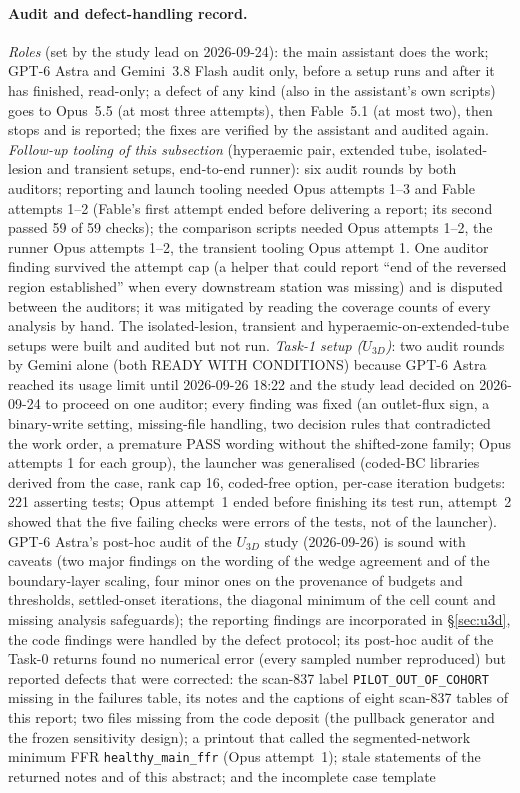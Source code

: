 \documentclass[11pt]{article}
\begin{document}
\paragraph{Audit and defect-handling record.}\label{sec:followup-audit} \emph{Roles} (set by the study lead on 2026-09-24): the main assistant does the work; GPT-6 Astra and Gemini~3.8 Flash audit only, before a setup runs and after it has finished, read-only; a defect of any kind (also in the assistant's own scripts) goes to Opus~5.5 (at most three attempts), then Fable~5.1 (at most two), then stops and is reported; the fixes are verified by the assistant and audited again. \emph{Follow-up tooling of this subsection} (hyperaemic pair, extended tube, isolated-lesion and transient setups, end-to-end runner): six audit rounds by both auditors; reporting and launch tooling needed Opus attempts 1--3 and Fable attempts 1--2 (Fable's first attempt ended before delivering a report; its second passed 59 of 59 checks); the comparison scripts needed Opus attempts 1--2, the runner Opus attempts 1--2, the transient tooling Opus attempt 1. One auditor finding survived the attempt cap (a helper that could report ``end of the reversed region established'' when every downstream station was missing) and is disputed between the auditors; it was mitigated by reading the coverage counts of every analysis by hand. The isolated-lesion, transient and hyperaemic-on-extended-tube setups were built and audited but not run. \emph{Task-1 setup ($U_{3D}$)}: two audit rounds by Gemini alone (both READY WITH CONDITIONS) because GPT-6 Astra reached its usage limit until 2026-09-26 18:22 and the study lead decided on 2026-09-24 to proceed on one auditor; every finding was fixed (an outlet-flux sign, a binary-write setting, missing-file handling, two decision rules that contradicted the work order, a premature PASS wording without the shifted-zone family; Opus attempts 1 for each group), the launcher was generalised (coded-BC libraries derived from the case, rank cap 16, coded-free option, per-case iteration budgets: 221 asserting tests; Opus attempt~1 ended before finishing its test run, attempt~2 showed that the five failing checks were errors of the tests, not of the launcher). GPT-6 Astra's post-hoc audit of the $U_{3D}$ study (2026-09-26) is sound with caveats (two major findings on the wording of the wedge agreement and of the boundary-layer scaling, four minor ones on the provenance of budgets and thresholds, settled-onset iterations, the diagonal minimum of the cell count and missing analysis safeguards); the reporting findings are incorporated in \S\ref{sec:u3d}, the code findings were handled by the defect protocol; its post-hoc audit of the Task-0 returns found no numerical error (every sampled number reproduced) but reported defects that were corrected: the scan-837 label \texttt{PILOT\_OUT\_OF\_COHORT} missing in the failures table, its notes and the captions of eight scan-837 tables of this report; two files missing from the code deposit (the pullback generator and the frozen sensitivity design); a printout that called the segmented-network minimum FFR \texttt{healthy\_main\_ffr} (Opus attempt~1); stale statements of the returned notes and of this abstract; and the incomplete case template 
\end{document}
